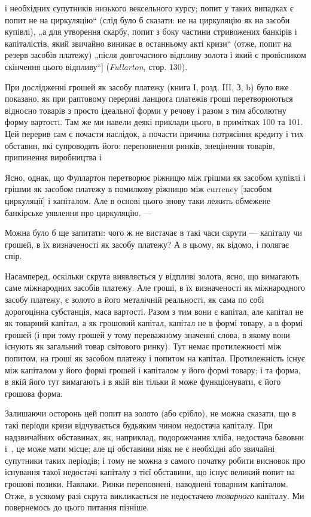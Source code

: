 \parcont{}  %
і необхідних супутників низького вексельного курсу; попит у таких
випадках є попит не на циркуляцію“ (слід було б сказати:
не на циркуляцію як на засоби купівлі), „а для утворення скарбу,
попит з боку частини стривожених банкірів і капіталістів, який
звичайно виникає в останньому акті кризи“ (отже, попит на резерв
засобів платежу) „після довгочасного відпливу золота і який є
провісником скінчення цього відпливу“] (\emph{Fullarton}, стор. 130).

При дослідженні грошей як засобу платежу (книга І, розд. III,
З, b) було вже показано, як при раптовому перериві ланцюга платежів
гроші перетворюються відносно товарів з просто ідеальної
форми у речову і разом з тим абсолютну форму вартостi.
Там же ми навели деякі приклади цього, в примітках 100 та 101.
Цей перерив сам є почасти наслідок, а почасти причина потрясіння
кредиту і тих обставин, які супроводять його: переповнення
ринків, знецінення товарів, припинення виробництва і~

Ясно, однак, що Фуллартон перетворює ріжницю між грішми як
засобом купівлі і грішми як засобом платежу в помилкову ріжницю
між currency [засобом циркуляції] і капіталом. Але в основі
цього знову таки лежить обмежене банкірське уявлення про
циркуляцію. —

Можна було б ще запитати: чого ж не вистачає в такі часи
скрути — капіталу чи грошей, в їх визначеності як засобу платежу?
А в цьому, як відомо, і полягає спір.

Насамперед, оскільки скрута виявляється у відпливі золота,
ясно, що вимагають саме міжнародних засобів платежу. Але
гроші, в їх визначеності як міжнародного засобу платежу, є
золото в його металічній реальності, як сама по собі дорогоцінна
субстанція, маса вартості. Разом з тим вони є капітал, але капітал
не як товарний капітал, а як грошовий капітал, капітал не
в формі товару, а в формі грошей (і при тому грошей у тому
переважному значенні слова, в якому вони існують як загальний
товар світового ринку). Тут немає протилежності між попитом,
на гроші як засобом платежу і попитом на капітал. Протилежність
існує між капіталом у його формі грошей і капіталом у
його формі товару; і та форма, в якій його тут вимагають і в
якій він тільки й може функціонувати, є його грошова форма.

Залишаючи осторонь цей попит на золото (або срібло), не
можна сказати, що в такі періоди кризи відчувається будьяким
чином недостача капіталу. При надзвичайних обставинах, як,
наприклад, подорожчання хліба, недостача бавовни і~, це
може мати місце; але ці обставини ніяк не є необхідні або звичайні
супутники таких періодів; і тому не можна з самого початку
робити висновок про існування такої недостачі капіталу
з тієї обставини, що існує великий попит на грошові позики.
Навпаки. Ринки переповнені, наводнені товарним капіталом.
Отже, в усякому разі скрута викликається не недостачею \emph{товарного}
капіталу. Ми повернемось до цього питання пізніше.
\parbreak{}  %
